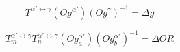 $$T^{\alpha'\leftrightarrow\gamma}\left(Og^{\alpha'}\right)\left(Og^{\gamma}\right)^{-1} = \Delta g \label{eq:1}$$

$$T_{m}^{\alpha'\leftrightarrow\gamma}T_{n}^{\alpha'\leftrightarrow\gamma}\left(Og_{a}^{\alpha'}\right)\left(Og_{b}^{\alpha'}\right)^{-1} = \Delta OR \label{eq:2}$$
